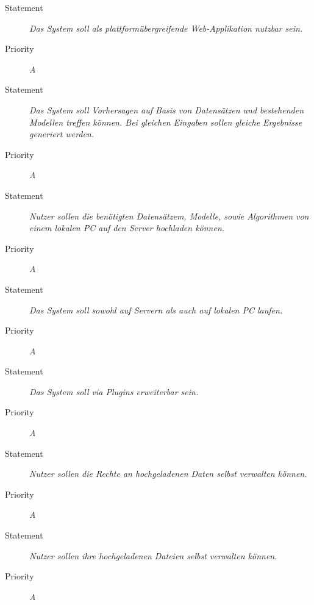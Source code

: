 \UR
\begin{description}
\item [Statement] \textit{Das System soll als plattformübergreifende \gls{Web-Applikation} nutzbar sein.}
\item [Priority] \textit{A}
\end{description}

\UR
\begin{description}
\item[Statement] \textit{Das System soll Vorhersagen auf Basis von Datensätzen und bestehenden Modellen treffen können. Bei gleichen Eingaben sollen gleiche Ergebnisse generiert werden.}
\item[Priority] \textit{A}
\end{description}


\UR
\begin{description}
\item[Statement] \textit{Nutzer sollen die benötigten Datensätzem, Modelle, sowie Algorithmen von einem lokalen PC auf den Server hochladen können.}
\item[Priority] \textit{A}
\end{description}

\UR
\begin{description}
\item[Statement] \textit{Das System soll sowohl auf Servern als auch auf lokalen PC laufen.}
\item[Priority] \textit{A}
\end{description}

\UR
\begin{description}
\item[Statement] \textit{Das System soll via \gls{Plugins} erweiterbar sein.}
\item[Priority] \textit{A}
\end{description}

\UR
\begin{description}
\item[Statement] \textit{Nutzer sollen die Rechte an hochgeladenen Daten selbst verwalten können.}
\item[Priority] \textit{A}
\end{description}

\UR
\begin{description}
\item[Statement] \textit{Nutzer sollen ihre hochgeladenen Dateien selbst verwalten können.}
\item[Priority] \textit{A}
\end{description}


